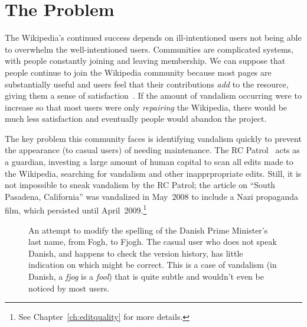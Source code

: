 \section{The Problem}

The Wikipedia's continued success depends on ill-intentioned users
not being able to overwhelm the well-intentioned users.
Communities are complicated systems, with people constantly joining and
leaving membership.
We can suppose that people continue to
join the Wikipedia community because most pages are
substantially useful and users feel that their contributions
\textit{add} to the resource,
giving them a sense of satisfaction~\cite{Benkler2002}.
If the amount of vandalism occurring were to increase so that
most users were only \textit{repairing} the Wikipedia, there
would be much less satisfaction and eventually people would
abandon the project.

The key problem this community faces is identifying vandalism
quickly to prevent the appearance (to casual users)
 of needing maintenance.
The RC Patrol~\cite{wiki:RCPatrol} acts as a guardian,
investing a large amount of human capital to scan all
edits made to the Wikipedia, searching for vandalism and
other inapprpropriate edits.
Still, it is not impossible to sneak vandalism by the
RC Patrol; the article on ``South Pasadena, California''
was vandalized in May~2008 to include a Nazi propaganda film,
which persisted until April~2009.\footnote{See Chapter~\ref{ch:editquality}
for more details.}

\begin{figure}[t]
\centering
{}
\hspace{1ex}
\caption[An example of vandalism which is non-obvious to the casual reader.]{An attempt to modify the
  spelling of the Danish Prime Minister's last name, from Fogh, to Fjogh.
  The casual user who does not speak Danish, and happens to check
  the version history, has little indication on which might be correct.
  This is a case of vandalism
  (in Danish, a \textit{fjog} is a \textit{fool})
  that is quite subtle and wouldn't even be noticed by most users.}
\label{fig-denmark}
\end{figure}


